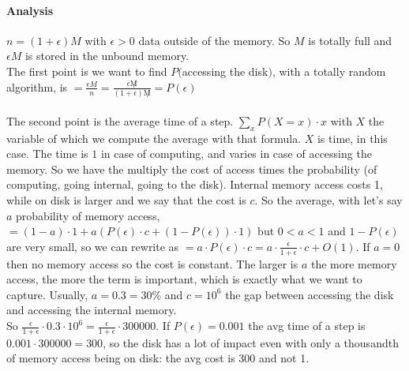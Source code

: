 \documentclass[10pt]{report}
\begin{document}
\paragraph{Analysis}
$n = (1 + \epsilon)M$ with $\epsilon > 0$ data outside of the memory. So $M$ is totally full and $\epsilon M$ is stored in the unbound memory.\\
The first point is we want to find $P($accessing the disk$)$, with a totally random algorithm, is $= \frac{\epsilon M}{n} = \frac{\epsilon\not M}{(1 + \epsilon)\not M} = P(\epsilon)$\\\\
The second point is the average time of a step. $\sum_x P(X = x)\cdot x$ with $X$ the variable of which we compute the average with that formula. $X$ is time, in this case. The time is $1$ in case of computing, and varies in case of accessing the memory. So we have the multiply the cost of access times the probability (of computing, going internal, going to the disk). Internal memory access costs 1, while on disk is larger and we say that the cost is $c$. So the average, with let's say $a$ probability of memory access, $= (1 - a)\cdot 1 + a(P(\epsilon)\cdot c + (1 - P(\epsilon))\cdot 1)$ but $0 < a < 1$ and $1 - P(\epsilon)$ are very small, so we can rewrite as $= a\cdot P(\epsilon)\cdot c = a \cdot \frac{\epsilon}{1 + \epsilon} \cdot c + O(1)$. If $a = 0$ then no memory access so the cost is constant. The larger is $a$ the more memory access, the more the term is important, which is exactly what we want to capture. Usually, $a = 0.3 = 30\%$ and $c = 10^6$ the gap between accessing the disk and accessing the internal memory.\\
So $\frac{\epsilon}{1 + \epsilon}\cdot 0.3 \cdot 10^6 = \frac{\epsilon}{1 + \epsilon} \cdot 300000$. If $P(\epsilon) = 0.001$ the avg time of a step is $0.001 \cdot 300000 = 300$, so the disk has a lot of impact even with only a thousandth of memory access being on disk: the avg cost is 300 and not 1.
\end{document}
